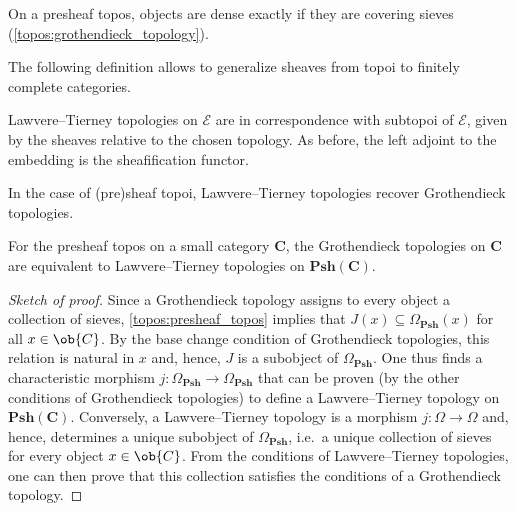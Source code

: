     \begin{example}
        On a presheaf topos, objects are dense exactly if they are covering sieves (\cref{topos:grothendieck_topology}).
    \end{example}

    The following definition allows to generalize sheaves from topoi to finitely complete categories.

    \begin{property}
        Lawvere--Tierney topologies on $\mathcal{E}$ are in correspondence with subtopoi of $\mathcal{E}$, given by the sheaves relative to the chosen topology. As before, the left adjoint to the embedding is the sheafification functor.
    \end{property}

    In the case of (pre)sheaf topoi, Lawvere--Tierney topologies recover Grothendieck topologies.
    \begin{result}
        For the presheaf topos on a small category $\mathbf{C}$, the Grothendieck topologies on $\mathbf{C}$ are equivalent to Lawvere--Tierney topologies on $\mathbf{Psh(C)}$.
        \begin{mdframed}[roundcorner=10pt, linecolor=blue, linewidth=1pt]
            \begin{proof}[Sketch of proof]
                Since a Grothendieck topology assigns to every object a collection of sieves, \cref{topos:presheaf_topos} implies that $J(x)\subseteq\Omega_\mathbf{Psh}(x)$ for all $x\in\ob{C}$. By the base change condition of Grothendieck topologies, this relation is natural in $x$ and, hence, $J$ is a subobject of $\Omega_\mathbf{Psh}$. One thus finds a characteristic morphism $j:\Omega_\mathbf{Psh}\rightarrow\Omega_\mathbf{Psh}$ that can be proven (by the other conditions of Grothendieck topologies) to define a Lawvere--Tierney topology on $\mathbf{Psh(C)}$. Conversely, a Lawvere--Tierney topology is a morphism $j:\Omega\rightarrow\Omega$ and, hence, determines a unique subobject of $\Omega_\mathbf{Psh}$, i.e.~a unique collection of sieves for every object $x\in\ob{C}$. From the conditions of Lawvere--Tierney topologies, one can then prove that this collection satisfies the conditions of a Grothendieck topology.
            \end{proof}
        \end{mdframed}
    \end{result}

